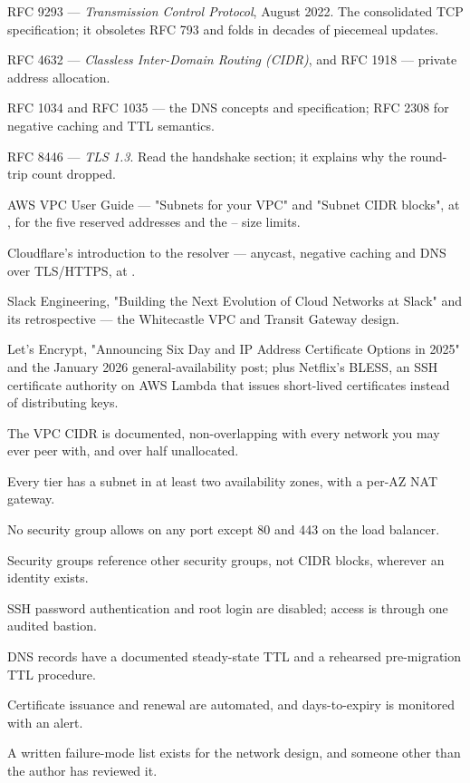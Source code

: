 \begin{wbitem}
  \item RFC 9293 --- \emph{Transmission Control Protocol}, August 2022. The consolidated TCP specification; it obsoletes RFC 793 and folds in decades of piecemeal updates.
  \item RFC 4632 --- \emph{Classless Inter-Domain Routing (CIDR)}, and RFC 1918 --- private address allocation.
  \item RFC 1034 and RFC 1035 --- the DNS concepts and specification; RFC 2308 for negative caching and TTL semantics.
  \item RFC 8446 --- \emph{TLS 1.3}. Read the handshake section; it explains why the round-trip count dropped.
  \item AWS VPC User Guide --- "Subnets for your VPC" and "Subnet CIDR blocks", at , for the five reserved addresses and the -- size limits.
  \item Cloudflare's introduction to the  resolver --- anycast, negative caching and DNS over TLS/HTTPS, at .
  \item Slack Engineering, "Building the Next Evolution of Cloud Networks at Slack" and its retrospective --- the Whitecastle VPC and Transit Gateway design.
  \item Let's Encrypt, "Announcing Six Day and IP Address Certificate Options in 2025" and the January 2026 general-availability post; plus Netflix's BLESS, an SSH certificate authority on AWS Lambda that issues short-lived certificates instead of distributing keys.
\end{wbitem}

\begin{checklist}
  \item The VPC CIDR is documented, non-overlapping with every network you may ever peer with, and over half unallocated.
  \item Every tier has a subnet in at least two availability zones, with a per-AZ NAT gateway.
  \item No security group allows  on any port except 80 and 443 on the load balancer.
  \item Security groups reference other security groups, not CIDR blocks, wherever an identity exists.
  \item SSH password authentication and root login are disabled; access is through one audited bastion.
  \item DNS records have a documented steady-state TTL and a rehearsed pre-migration TTL procedure.
  \item Certificate issuance and renewal are automated, and days-to-expiry is monitored with an alert.
  \item A written failure-mode list exists for the network design, and someone other than the author has reviewed it.
\end{checklist}

